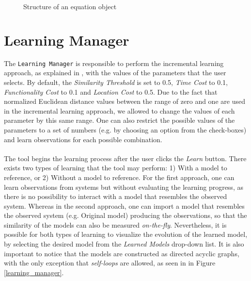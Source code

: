 \begin{figure}[t]
	\centering
		\caption{Structure of an equation object}
	\label{equation_Structure}
\end{figure} 
 
\newpage
 
\section{Learning Manager}
The \texttt{Learning Manager} is responsible to perform the incremental learning approach, as explained in , with the values of the parameters that the user selects. By default, the \textit{Similarity Threshold} is set to 0.5, \textit{Time Cost} to 0.1, \textit{Functionality Cost} to 0.1 and \textit{Location Cost} to 0.5. Due to the fact that normalized Euclidean distance values between the range of zero and one are used in the incremental learning approach, we allowed to change the values of each parameter by this same range. One can also restrict the possible values of the parameters to a set of numbers (e.g. by choosing an option from the check-boxes) and learn observations for each possible combination.  
\\ \\
The tool begins the learning process after the user clicks the \textit{Learn} button. There exists two types of learning that the tool may perform: 1) With a model to reference, or 2) Without a model to reference. For the first approach, one can learn observations from systems but without evaluating the learning progress, as there is no possibility to interact with a model that resembles the observed system. Whereas in the second approach, one can import a model that resembles the observed system (e.g. Original model) producing the observations, so that the similarity of the models can also be measured \textit{on-the-fly}. Nevertheless, it is possible for both types of learning to visualize the evolution of the learned model, by selecting the desired model from the \textit{Learned Models} drop-down list. It is also important to notice that the models are constructed as directed acyclic graphs, with the only exception that \textit{self-loops} are allowed, as seen in in Figure \ref{learning_manager}. 
